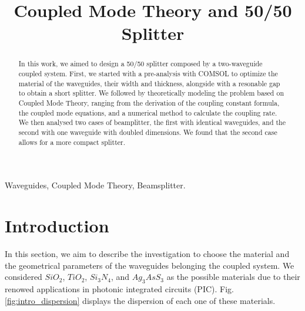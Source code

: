 \documentclass[conference, a4paper]{IEEEtran}
\begin{document}
\title{Coupled Mode Theory and 50/50 Splitter}

\author{
\and
{}
}

\maketitle

\begin{abstract}
    In this work, we aimed to design a 50/50 splitter composed by a two-waveguide coupled system. First, we started with a pre-analysis with COMSOL to optimize the material of the waveguides, their width and thickness, alongside with a resonable gap to obtain a short splitter. We followed by theoretically modeling the problem based on Coupled Mode Theory, ranging from the derivation of the coupling constant formula, the coupled mode equations, and a numerical method to calculate the coupling rate. We then analysed two cases of beamplitter, the first with identical waveguides, and the second with one waveguide with doubled dimensions. We found that the second case allows for a more compact splitter.
\end{abstract}

\begin{IEEEkeywords}
    Waveguides, Coupled Mode Theory, Beamsplitter.
\end{IEEEkeywords}

\section{Introduction}
\label{sec:intro}

In this section, we aim to describe the investigation to choose the material and the geometrical parameters of the waveguides belonging the coupled system. We considered $SiO_2$, $TiO_2$, $Si_3N_4$, and $Ag_3AsS_3$ as the possible materials due to their renowed applications in photonic integrated circuits (PIC). Fig. \ref{fig:intro_dispersion} displays the dispersion of each one of these materials. %
\end{document}
